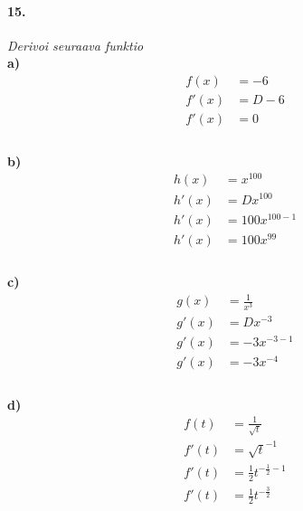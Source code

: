 \documentclass[12pt, a4paper]{article}
\begin{document}
    \paragraph*{15.}
    \textit{
        Derivoi seuraava funktio\\
    }
    \textbf{a)}
    \begin{equation*}
    \begin{split}
        f(x)&=-6\\
        f'(x)&=D-6\\
        f'(x)&= 0\\
    \end{split}
    \end{equation*}
    \\
    \textbf{b)}
    \begin{equation*}
    \begin{split}
        h(x)&=x^{100}\\
        h'(x)&=Dx^{100}\\
        h'(x)&=100x^{100-1}\\
        h'(x)&=100x^{99}\\
    \end{split}
    \end{equation*}
    \\
    \textbf{c)}
    \begin{equation*}
    \begin{split}
        g(x)&= \frac{1}{x^3}\\
        g'(x)&= Dx^{-3}\\
        g'(x)&= -3x^{-3-1}\\
        g'(x)&= -3x^{-4}\\
    \end{split}
    \end{equation*}
    \\
    \textbf{d)}
    \begin{equation*}
    \begin{split}
        f(t)&= \frac{1}{\sqrt{t}}\\
        f'(t)&= \sqrt{t}^{-1}\\
        f'(t)&= \frac{1}{2}t^{-\frac{1}{2}-1}\\
        f'(t)&= \frac{1}{2}t^{-\frac{3}{2}}\\
    \end{split}
    \end{equation*}
\newpage
\end{document}
